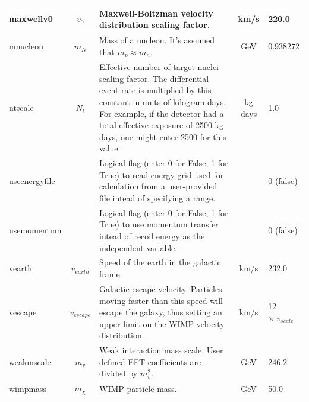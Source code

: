 \documentclass[11pt]{article}
\begin{document}
\begin{longtable}{| l | c | p{2.5in} | c | l | }
  \hline maxwellv0 & $v_0$ & Maxwell-Boltzman velocity distribution scaling factor. &
  km/s & 220.0 \\

  \hline mnucleon & $m_N$ & Mass of a nucleon. It's assumed that $m_p\approx m_n$. &
  GeV & 0.938272 \\

  \hline ntscale & $N_t$ & Effective number of target nuclei scaling factor. The
  differential event rate is multiplied by this constant in units of
  kilogram-days. For example, if the detector had a total effective exposure of
  2500 kg days, one might enter 2500 for this value. & kg days & 1.0 \\

  \hline useenergyfile & & Logical flag (enter 0 for False, 1 for True) to read energy
  grid used for calculation from a user-provided file intead of specifying a
  range. & & 0 (false) \\

  \hline usemomentum & & Logical flag (enter 0 for False, 1 for True) to use momentum
  transfer intead of recoil energy as the independent variable. & &0 (false) \\

  \hline vearth & $v_{earth}$ & Speed of the earth in the galactic frame. & km/s & 
  232.0\\

  \hline vescape & $v_{escape}$ & Galactic escape velocity. Particles moving faster than
  this speed will escape the galaxy, thus setting an upper limit on the WIMP
  velocity distribution. & km/s & 12 $\times\ v_{scale}$ \\

  \hline weakmscale & $m_v$ & Weak interaction mass scale. User defined EFT coefficients
  are divided by $m_v^2$. & GeV & 246.2 \\

  \hline wimpmass & $m_\chi$ & WIMP particle mass. & GeV & 50.0\\
  \hline
\end{longtable}
\end{document}
